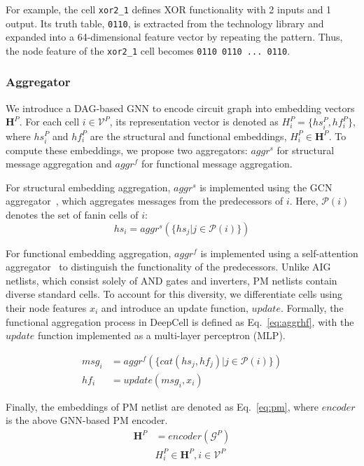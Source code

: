 For example, the cell \texttt{xor2\_1} defines XOR functionality with 2 inputs and 1 output. Its truth table, \texttt{0110}, is extracted from the technology library and expanded into a 64-dimensional feature vector by repeating the pattern. Thus, the node feature of the \texttt{xor2\_1} cell becomes \texttt{0110 0110 ... 0110}.

\subsubsection{Aggregator}
We introduce a DAG-based GNN to encode circuit graph into embedding vectors $\mathbf{H}^P$. For each cell $i\in \mathcal{V}^P$, its representation vector is denoted as $H_i^P = \{hs_i^P, hf_i^P\}$, where $hs_i^P$ and $hf_i^P$ are the structural and functional embeddings, $H_i^P \in \mathbf{H}^P$. 
To compute these embeddings, we propose two aggregators: $aggr^{s}$ for structural message aggregation and $aggr^{f}$ for functional message aggregation.

For structural embedding aggregation, $aggr^{s}$ is implemented using the GCN aggregator~\cite{kipf2016semi}, which aggregates messages from the predecessors of $i$. Here, $\mathcal{P}(i)$ denotes the set of fanin cells of $i$: 
\begin{equation} \label{eq:aggrhs}
    hs_i = aggr^s(\{hs_j | j\in \mathcal{P}(i)\})
\end{equation}

For functional embedding aggregation, $aggr^{f}$ is implemented using a self-attention aggregator~\cite{velivckovic2017graph} to distinguish the functionality of the predecessors. Unlike AIG netlists, which consist solely of AND gates and inverters, PM netlists contain diverse standard cells. To account for this diversity, we differentiate cells using their node features $x_i$ and introduce an update function, $update$. Formally, the functional aggregation process in DeepCell is defined as Eq.~\eqref{eq:aggrhf}, with the $update$ function implemented as a multi-layer perceptron (MLP).  

\begin{equation} \label{eq:aggrhf}
    \begin{split}
        msg_i & = aggr^f(\{cat(hs_j, hf_j) | j \in \mathcal{P}(i)\}) \\ 
        hf_i & = update(msg_i, x_i) 
    \end{split}
\end{equation}

Finally, the embeddings of PM netlist are denoted as Eq.~\eqref{eq:pm}, where $encoder$ is the above GNN-based PM encoder. 
\begin{equation} \label{eq:pm}
    \begin{split}
        \mathbf{H}^P & = encoder(\mathcal{G}^P) \\ 
        & H_i^P \in \mathbf{H}^P, i \in \mathcal{V}^P 
    \end{split}
\end{equation}

